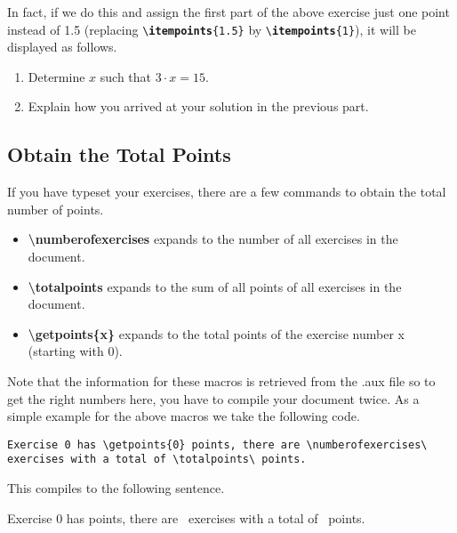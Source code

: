 \documentclass[
  twocolumn,%
  fontsize=9pt,%
  DIV=calc,%
  numbers=noendperiod%
]{scrartcl}
\newcommand{\emphstyle}{\ttfamily\color{NavyBlue}\bfseries}%
\newcommand{\keyword}[1]{{\emphstyle#1}}%
\begin{document}
\noindent In fact, if we do this and assign the first part of the above exercise just one point instead of 1.5 (replacing \texttt{\textbackslash\keyword{itempoints}\{1.5\}} by \texttt{\textbackslash \keyword{itempoints}\{1\}}), it will be displayed as follows.
\begin{exercise}\vspace{-1.5em}
  \begin{enumerate}
    \item Determine $x$ such that $3 \cdot x = 15$.
    \item Explain how you arrived at your solution in the previous part.
  \end{enumerate}
\end{exercise}

\subsection{Obtain the Total Points}
If you have typeset your exercises, there are a few commands to obtain the total number of points.

\begin{itemize}
  \item \textcolor{NavyBlue}{\ttfamily\bfseries\textbackslash numberofexercises} expands to the number of all exercises in the document.
  \item \textcolor{NavyBlue}{\ttfamily\bfseries\textbackslash totalpoints} expands to the sum of all points of all exercises in the document. 
  \item \textcolor{NavyBlue}{\ttfamily\bfseries\textbackslash getpoints\{x\}} expands to the total points of the exercise number x (starting with $0$). 
\end{itemize}
Note that the information for these macros is retrieved from the .aux file so to get the right numbers here, you have to compile your document twice. As a simple example for the above macros we take the following code.


\begin{lstlisting}[emph={numberofexercises,totalpoints,getpoints}]
Exercise 0 has \getpoints{0} points, there are \numberofexercises\ exercises with a total of \totalpoints\ points.
\end{lstlisting}

\noindent This compiles to the following sentence.\smallskip

Exercise 0 has  points, there are \numberofexercises\ exercises with a total of \totalpoints\ points.
\end{document}
